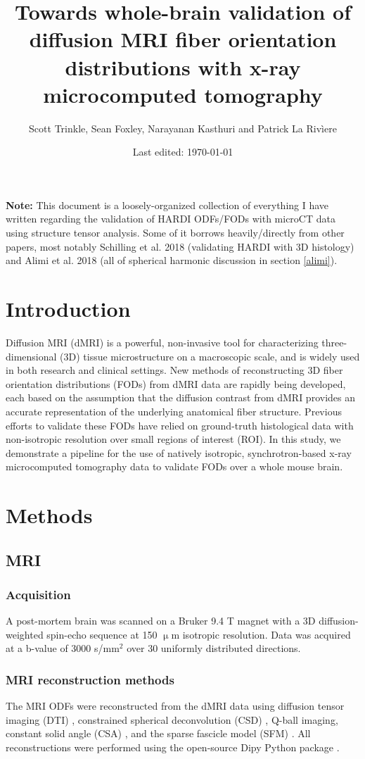 \documentclass[11pt]{article}
\title{Towards whole-brain validation of diffusion MRI fiber orientation
  distributions with x-ray microcomputed tomography}
\author{Scott Trinkle, Sean
  Foxley, Narayanan Kasthuri and Patrick La Riv\`iere}
\date{Last edited: \today}
\begin{document}
\maketitle

\textbf{Note:} This document is a loosely-organized collection of everything I
have written regarding the validation of HARDI ODFs/FODs with microCT data using
structure tensor analysis. Some of it borrows heavily/directly from other
papers, most notably Schilling et al. 2018 \cite{Schilling2018} (validating
HARDI with 3D histology) and Alimi et al. 2018 \cite{Alimi2018} (all of
spherical harmonic discussion in section \ref{alimi}).


\section{Introduction}
Diffusion MRI (dMRI) is a powerful, non-invasive tool for characterizing
three-dimensional (3D) tissue microstructure on a macroscopic scale, and is
widely used in both research and clinical settings. New methods of
reconstructing 3D fiber orientation distributions (FODs) from dMRI data are
rapidly being developed, each based on the assumption that the diffusion
contrast from dMRI provides an accurate representation of the underlying
anatomical fiber structure. Previous efforts to validate these FODs have relied
on ground-truth histological data with non-isotropic resolution over small
regions of interest (ROI). In this study, we demonstrate a pipeline for the use
of natively isotropic, synchrotron-based x-ray microcomputed tomography data to
validate FODs over a whole mouse brain.

\section{Methods}
\subsection{MRI}
\subsubsection{Acquisition}
A post-mortem brain was scanned on a Bruker 9.4 T magnet with a 3D
diffusion-weighted spin-echo sequence at 150 $\upmu$m isotropic
resolution. Data was acquired at a b-value of 3000 s/mm$^2$ over 30 uniformly
distributed directions.

\subsubsection{MRI reconstruction methods}
The MRI ODFs were reconstructed from the dMRI data using diffusion tensor
imaging (DTI) \cite{Basser1994}, constrained spherical deconvolution (CSD)
\cite{Tournier2004}, Q-ball imaging, constant solid angle (CSA)
\cite{Aganj2010}, and the sparse fascicle model (SFM) \cite{Rokem2015}. All
reconstructions were performed using the open-source Dipy Python package
\cite{Garyfallidis2014}.
\end{document}

